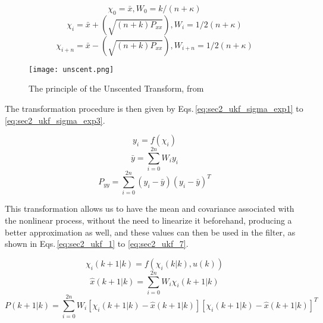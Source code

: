 \begin{equation}
    \label{eq:sec2_ukf_sigma1}
    \chi_0 = \bar{x}, W_0 = k/(n+\kappa)
\end{equation}
\begin{equation}
    \label{eq:sec2_ukf_sigma2}
    \chi_i = \bar{x} + \left( \sqrt{(n+k)P_{xx}} \right), W_i = 1/2(n+\kappa)
\end{equation}
\begin{equation}
    \label{eq:sec2_ukf_sigma3}
    \chi_{i+n} = \bar{x} - \left( \sqrt{(n+k)P_{xx}} \right), W_{i+n} = 1/2(n+\kappa)
\end{equation}

\begin{figure}[ht]
    \centering
    \texttt{[image: unscent.png]}
    \caption[The principle of the Unscented Transform]{The principle of the Unscented Transform, from \cite{julier1997new}}
    \label{fig:sec2_unscent}
\end{figure}

The transformation procedure is then given by Eqs.\,\eqref{eq:sec2_ukf_sigma_exp1} to \eqref{eq:sec2_ukf_sigma_exp3}.

\begin{equation}
    \label{eq:sec2_ukf_sigma_exp1}
    y_i=f(\chi_i)
\end{equation}
\begin{equation}
    \label{eq:sec2_ukf_sigma_exp2}
    \bar{y} = \sum_{i=0}^{2n} W_i y_i
\end{equation}
\begin{equation}
    \label{eq:sec2_ukf_sigma_exp3}
    P_{yy} = \sum_{i=0}^{2n} \left( y_i - \bar{y} \right) \left( y_i - \bar{y} \right) ^T
\end{equation}

This transformation allows us to have the mean and covariance associated with the nonlinear process, without the need to linearize it beforehand, producing a better approximation as well, and these values can then be used in the filter, as shown in Eqs.\,\eqref{eq:sec2_ukf_1} to \eqref{eq:sec2_ukf_7}.

\begin{equation}
    \label{eq:sec2_ukf_1}
    \chi_i (k+1|k) = f (\chi_i(k|k),u(k))
\end{equation}
\begin{equation}
    \label{eq:sec2_ukf_2}
    \hat{x}(k+1|k) = \sum_{i=0}^{2n} W_i  \chi_i (k+1|k) 
\end{equation}
\begin{equation}
    \label{eq:sec2_ukf_3}
    P(k+1|k) = \sum_{i=0}^{2n} W_i \left[  \chi_i (k+1|k) - \hat{x}(k+1|k) \right]  \left[  \chi_i (k+1|k) - \hat{x}(k+1|k) \right]^T
\end{equation}

